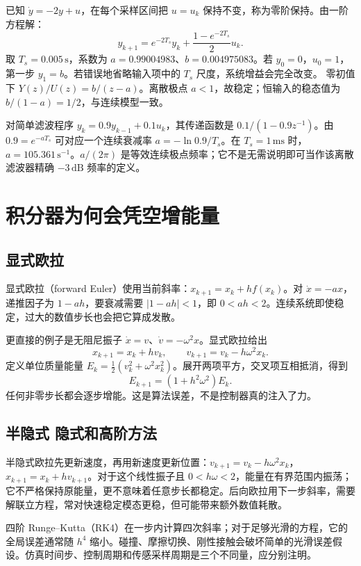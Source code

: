 \begin{examplebox}[算例 把连续一阶模型精确离散一次]
已知 $\dot y=-2y+u$，在每个采样区间把 $u=u_k$ 保持不变，称为零阶保持。由一阶方程解：
\[
 y_{k+1}=e^{-2T_s}y_k+\frac{1-e^{-2T_s}}2u_k.
\]
取 $T_s=0.005\,\mathrm s$，系数为 $a=0.99004983$、$b=0.004975083$。若 $y_0=0$，$u_0=1$，第一步 $y_1=b$。若错误地省略输入项中的 $T_s$ 尺度，系统增益会完全改变。
零初值下 $Y(z)/U(z)=b/(z-a)$。离散极点 $a<1$，故稳定；恒输入的稳态值为 $b/(1-a)=1/2$，与连续模型一致。
\end{examplebox}

对简单滤波程序 $y_k=0.9y_{k-1}+0.1u_k$，其传递函数是 $0.1/(1-0.9z^{-1})$。由 $0.9=e^{-aT_s}$ 可对应一个连续衰减率 $a=-\ln0.9/T_s$。在 $T_s=1\,\mathrm{ms}$ 时，$a=105.361\,\mathrm{s^{-1}}$。$a/(2\pi)$ 是等效连续极点频率；它不是无需说明即可当作该离散滤波器精确 $-3\,\mathrm{dB}$ 频率的定义。

\section{积分器为何会凭空增能量}
\subsection{显式欧拉}
显式欧拉（forward Euler）使用当前斜率：$x_{k+1}=x_k+h f(x_k)$。对 $\dot x=-ax$，递推因子为 $1-ah$，要衰减需要 $|1-ah|<1$，即 $0<ah<2$。连续系统即使稳定，过大的数值步长也会把它算成发散。

更直接的例子是无阻尼振子 $\dot x=v$、$\dot v=-\omega^2x$。显式欧拉给出
\[
 x_{k+1}=x_k+hv_k,\qquad v_{k+1}=v_k-h\omega^2x_k.
\]
定义单位质量能量 $E_k=\frac12(v_k^2+\omega^2x_k^2)$。展开两项平方，交叉项互相抵消，得到
\begin{equation}
 E_{k+1}=(1+h^2\omega^2)E_k.
\end{equation}
任何非零步长都会逐步增能。这是算法误差，不是控制器真的注入了力。

\subsection{半隐式 隐式和高阶方法}
半隐式欧拉先更新速度，再用新速度更新位置：$v_{k+1}=v_k-h\omega^2x_k$，$x_{k+1}=x_k+hv_{k+1}$。对于这个线性振子且 $0<h\omega<2$，能量在有界范围内振荡；它不严格保持原能量，更不意味着任意步长都稳定。后向欧拉用下一步斜率，需要解联立方程，常对快速稳定模态更稳，但可能带来额外数值耗散。

四阶 Runge--Kutta（RK4）在一步内计算四次斜率；对于足够光滑的方程，它的全局误差通常随 $h^4$ 缩小。碰撞、摩擦切换、刚性接触会破坏简单的光滑误差假设。仿真时间步、控制周期和传感采样周期是三个不同量，应分别注明。

